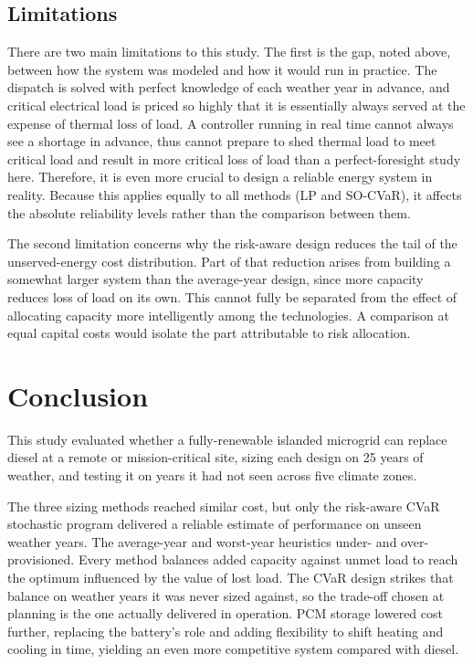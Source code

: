 \documentclass[
  journal=large,
  manuscript=article-type,
  year=2020,
  volume=37,
]{cup-journal}
\begin{document}
\subsection{Limitations}

There are two main limitations to this study. The first is the gap, noted above, between how the system was modeled and how it would run in practice. The dispatch is solved with perfect knowledge of each weather year in advance, and critical electrical load is priced so highly that it is essentially always served at the expense of thermal loss of load. A controller running in real time cannot always see a shortage in advance, thus cannot prepare to shed thermal load to meet critical load and result in more critical loss of load than a perfect-foresight study here. Therefore, it is even more crucial to design a reliable energy system in reality. Because this applies equally to all methods (LP and SO-CVaR), it affects the absolute reliability levels rather than the comparison between them.

The second limitation concerns why the risk-aware design reduces the tail of the unserved-energy cost distribution. Part of that reduction arises from building a somewhat larger system than the average-year design, since more capacity reduces loss of load on its own. This cannot fully be separated from the effect of allocating capacity more intelligently among the technologies. A comparison at equal capital costs would isolate the part attributable to risk allocation.

\section{Conclusion}

This study evaluated whether a fully-renewable islanded microgrid can replace diesel at a remote or mission-critical site, sizing each design on 25 years of weather, and testing it on years it had not seen across five climate zones.

The three sizing methods reached similar cost, but only the risk-aware CVaR stochastic program delivered a reliable estimate of performance on unseen weather years. The average-year and worst-year heuristics under- and over-provisioned. Every method balances added capacity against unmet load to reach the optimum influenced by the value of lost load. The CVaR design strikes that balance on weather years it was never sized against, so the trade-off chosen at planning is the one actually delivered in operation. PCM storage lowered cost further, replacing the battery's role and adding flexibility to shift heating and cooling in time, yielding an even more competitive system compared with diesel.
\end{document}

